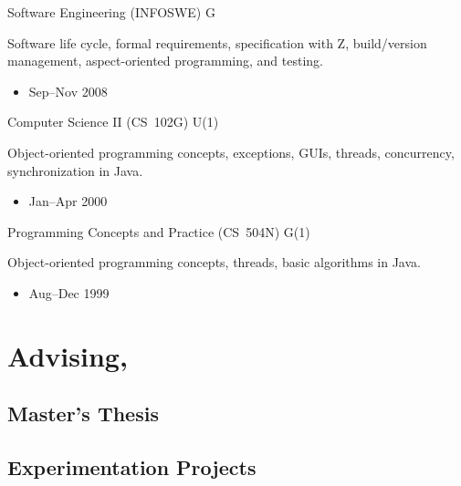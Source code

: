 \documentclass[11pt,a4paper,roman]{moderncv}
\begin{document}
\cventry%
{}%
{Software Engineering (INFOSWE)}%
{\uu}%
{}%
{G}%
{Software life cycle, formal requirements, specification with Z, build/version management, aspect-oriented programming, and testing.
\begin{itemize}
\item Sep--Nov 2008
\end{itemize}}

\cventry%
{}%
{Computer Science II (CS~102G)}%
{\wustl}%
{}%
{U(1)}%
{Object-oriented programming concepts, exceptions, GUIs, threads, concurrency, synchronization in Java.
\begin{itemize}
\item Jan--Apr 2000
\end{itemize}}

\cventry%
{}%
{Programming Concepts and Practice (CS~504N)}%
{\wustl}%
{}%
{G(1)}%
{Object-oriented programming concepts, threads, basic algorithms in Java.
\begin{itemize}
\item Aug--Dec 1999
\end{itemize}}


\section{Advising, \uu}

\subsection{Master's Thesis}


\subsection{Experimentation Projects}

\end{document}
